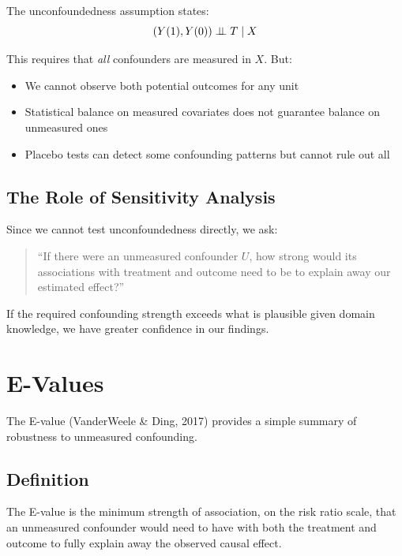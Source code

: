 The unconfoundedness assumption states:
\begin{equation}
(Y(1), Y(0)) \perp\!\!\!\perp T \mid X
\end{equation}

This requires that \emph{all} confounders are measured in $X$. But:
\begin{itemize}
    \item We cannot observe both potential outcomes for any unit
    \item Statistical balance on measured covariates does not guarantee balance on unmeasured ones
    \item Placebo tests can detect some confounding patterns but cannot rule out all
\end{itemize}

\subsection{The Role of Sensitivity Analysis}

Since we cannot test unconfoundedness directly, we ask:
\begin{quote}
``If there were an unmeasured confounder $U$, how strong would its associations with treatment and outcome need to be to explain away our estimated effect?''
\end{quote}

If the required confounding strength exceeds what is plausible given domain knowledge, we have greater confidence in our findings.

\section{E-Values}
\label{sec:e_value}

The E-value (VanderWeele \& Ding, 2017) provides a simple summary of robustness to unmeasured confounding.

\subsection{Definition}

\begin{definition}[E-Value]
\label{def:e_value}
The E-value is the minimum strength of association, on the risk ratio scale, that an unmeasured confounder would need to have with both the treatment and outcome to fully explain away the observed causal effect.
\end{definition}

